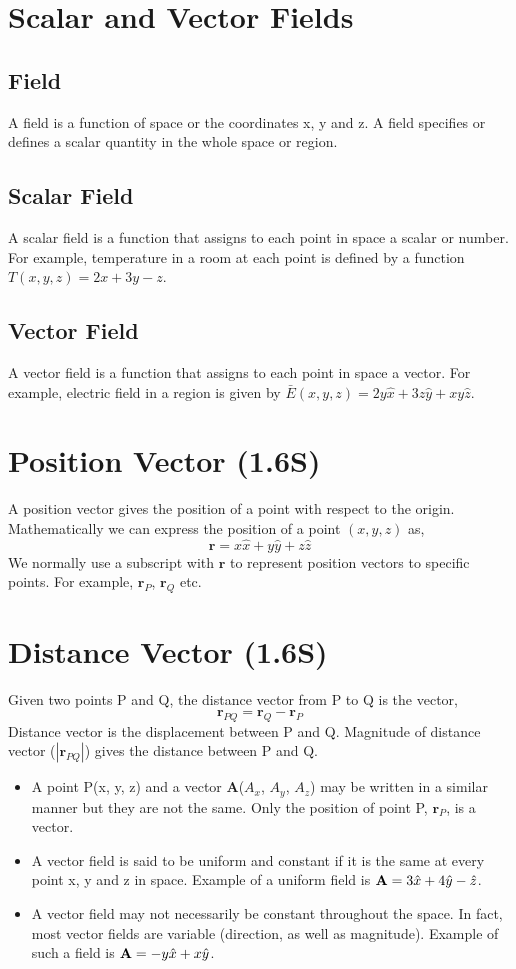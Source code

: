 \documentclass[12pt,a4paper]{article}
\begin{document}
\section{Scalar and Vector Fields}
\subsection{Field}
A field is a function of space or the coordinates x, y and z. A field specifies or defines a scalar quantity in the whole space or region.
\subsection{Scalar Field}
A scalar field is a function that assigns to each point in space a scalar or number. For example, temperature in a room at each point is defined by a function $T(x, y, z)=2x+3y-z$.
\subsection{Vector Field}
A vector field is a function that assigns to each point in space a vector. For example, electric field in a region is given by $\bar{E}(x, y, z)=2y\hat{x}+3z\hat{y}+xy\hat{z}$.
\section{Position Vector (1.6S)}
A position vector gives the position of a point with respect to the origin. Mathematically we can express the position of a point $(x,y,z)$ as,
\begin{equation}
\textbf{r}=x\hat x+y \hat y+z\hat z
\end{equation}
We normally use a subscript with $\textbf{r}$ to represent position vectors to specific points. For example, $\textbf{r}_P$, $\textbf{r}_Q$ etc.
\section{Distance Vector (1.6S)}
Given two points P and Q, the distance vector from P to Q is the vector,
\begin{equation}
\textbf{r}_{PQ}=\textbf{r}_{Q}-\textbf{r}_{P}
\end{equation}
Distance vector is the displacement between P and Q. Magnitude of distance vector ($|\textbf{r}_{PQ}|$) gives the distance between P and Q.

\begin{itemize}
\item A point P(x, y, z) and a vector \textbf{A}($A_x$, $A_y$, $A_z$) may be written in a similar manner but they are not the same. Only the position of point P, $\textbf{r}_P$, is a vector. \cite[page 8]{Sadiku}
\item A vector field is said to be uniform and constant if it is the same at every point x, y and z in space. Example of a uniform field is $\textbf A=3\hat x+4\hat y-\hat z$.
\item A vector field may not necessarily be constant throughout the space. In fact, most vector fields are variable (direction, as well as magnitude). Example of such a field is $\textbf A=-y\hat x+x\hat y$.
\end{itemize}
\end{document}
